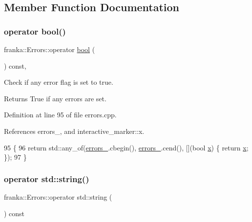 \subsection{Member Function Documentation}
\mbox{\label{structfranka_1_1Errors_a50cb6e50c1ce2b5ec281dcad83f1779e}} 
\subsubsection{\texorpdfstring{operator bool()}{operator bool()}}
{\footnotesize\ttfamily franka\+::\+Errors\+::operator \hyperlink{classbool}{bool} (\begin{DoxyParamCaption}{ }\end{DoxyParamCaption}) const\hspace{0.3cm}{\ttfamily [explicit]}, {\ttfamily [noexcept]}}

Check if any error flag is set to true.

\begin{DoxyReturn}{Returns}
True if any errors are set. 
\end{DoxyReturn}


Definition at line 95 of file errors.\+cpp.



References errors\+\_\+, and interactive\+\_\+marker\+::x.


\begin{DoxyCode}
95                                      \{
96   \textcolor{keywordflow}{return} std::any\_of(\hyperlink{structfranka_1_1Errors_ab269bb0ad30eb1aaa7009a246be8e8aa}{errors\_}.cbegin(), \hyperlink{structfranka_1_1Errors_ab269bb0ad30eb1aaa7009a246be8e8aa}{errors\_}.cend(), [](\textcolor{keywordtype}{bool} \hyperlink{namespaceinteractive__marker_acda52804aef30b460a72fb21ee01d69d}{x}) \{ \textcolor{keywordflow}{return} 
      \hyperlink{namespaceinteractive__marker_acda52804aef30b460a72fb21ee01d69d}{x}; \});
97 \}
\end{DoxyCode}
\mbox{\label{structfranka_1_1Errors_a63ed1948f69db5be95a9c70107955d68}} 
\subsubsection{\texorpdfstring{operator std\+::string()}{operator std::string()}}
{\footnotesize\ttfamily franka\+::\+Errors\+::operator std\+::string (\begin{DoxyParamCaption}{ }\end{DoxyParamCaption}) const\hspace{0.3cm}{\ttfamily [explicit]}}

